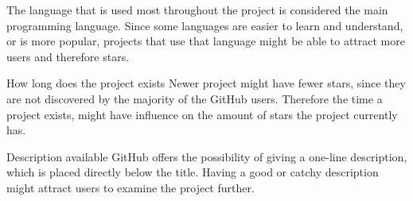 \begin{LaTeXdescription}
        The language that is used most throughout the project is considered the main programming language. 
        Since some languages are easier to learn and understand, or is more popular, projects that use that language might be able to attract more users and therefore stars.\cite{ieee-2015}
        \item[How long does the project exists]
        Newer project might have fewer stars, since they are not discovered by the majority of the GitHub users. 
        Therefore the time a project exists, might have influence on the amount of stars the project currently has.
        \item[Description available] GitHub offers the possibility of giving a one-line description, which is placed directly below the title. Having a good or catchy description might attract users to examine the project further.
    \end{LaTeXdescription}\hspace*{\fill}


